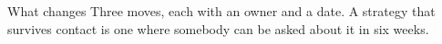 \begin{frame}{What changes}
  Three moves, each with an owner and a date. A strategy that survives contact is one where
  somebody can be asked about it in six weeks.
\end{frame}
